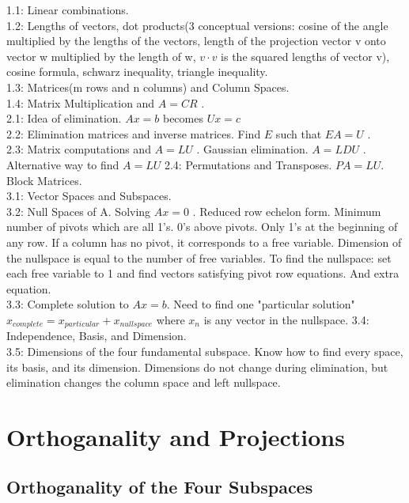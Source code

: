 \documentclass{report}
\begin{document}
1.1: Linear combinations. \\
1.2: Lengths of vectors, dot products(3 conceptual versions: cosine of the angle multiplied by the lengths of the vectors, length of the projection vector v onto vector w multiplied by the length of w, $v \cdot v$ is the squared lengths of vector v), cosine formula, schwarz inequality, triangle inequality.  \\
1.3: Matrices(m rows and n columns) and Column Spaces. \\
1.4: Matrix Multiplication and $ A = CR $ . \\
2.1: Idea of elimination. $ Ax = b $ becomes $ Ux = c $ \\
2.2: Elimination matrices and inverse matrices. Find $ E $ such that $ EA = U $ . \\
2.3: Matrix computations and $ A = LU $ . Gaussian elimination. $ A = LDU $ . Alternative way to find $ A = LU $ 
2.4: Permutations and Transposes. $ PA = LU $. Block Matrices. \\
3.1: Vector Spaces and Subspaces. \\
3.2: Null Spaces of A. Solving $ Ax = 0 $ . Reduced row echelon form. Minimum number of pivots which are all 1's. 0's above pivots. Only 1's at the beginning of any row. If a column has no pivot, it corresponds to a free variable. Dimension of the nullspace is equal to the number of free variables. To find the nullspace: set each free variable to 1 and find vectors satisfying pivot row equations. And extra equation. \\
3.3: Complete solution to $ Ax = b$. Need to find one "particular solution" $ x_{complete} = x_{particular} + x_{nullspace} $ where $x_n $ is any vector in the nullspace. 
3.4: Independence, Basis, and Dimension. \\
3.5: Dimensions of the four fundamental subspace. Know how to find every space, its basis, and its dimension. Dimensions do not change during elimination, but elimination changes the column space and left nullspace. 
\fi

\chapter{Orthoganality and Projections}

\section{Orthoganality of the Four Subspaces}

\end{document}

